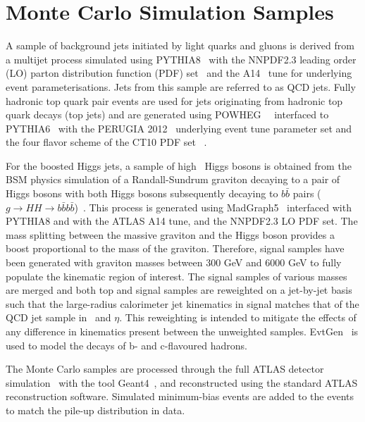 \section{Monte Carlo Simulation Samples}
\label{sec:mc}

\par A sample of background jets initiated by light quarks and gluons is derived from a multijet process simulated using PYTHIA8~\cite{Sjostrand:2007gs} with the NNPDF2.3 leading order (LO) parton distribution 
function (PDF) set~\cite{Ball:2012cx} and the A14~\cite{ATL-PHYS-PUB-2014-021} tune for underlying event parameterisations. 
Jets from this sample are referred to as QCD jets. Fully hadronic top quark pair events are used for jets originating from hadronic top quark decays (top jets) and are generated 
using POWHEG~\cite{Frixione:2007vw}~\cite{Nason:2004rx} interfaced to PYTHIA6~\cite{Sjostrand:2006za} with the PERUGIA 2012~\cite{Skands:2010ak} underlying event tune parameter set 
and the four flavor scheme of the CT10 PDF set ~\cite{Gao:2013xoa}.
\par For the boosted Higgs jets, a sample of high \pt~Higgs bosons is obtained from the BSM physics simulation of a Randall-Sundrum graviton decaying to a pair of Higgs bosons with both Higgs bosons 
subsequently decaying to $b\bar{b}$ pairs ($g\rightarrow HH \rightarrow b\bar{b}b\bar{b}$)~\cite{Randall:1999ee}. This process is generated using MadGraph5~\cite{Alwall:2014hca} 
interfaced with PYTHIA8 and with the ATLAS A14 tune, and the NNPDF2.3 LO PDF set. The mass splitting between the massive graviton and the Higgs boson provides a boost proportional to the mass of the graviton. 
Therefore, signal samples have been generated with graviton masses between 300 GeV and 6000 GeV to fully populate the kinematic region of interest. 
The signal samples of various masses are merged and both top and signal samples are reweighted on a jet-by-jet basis such that the large-radius calorimeter jet kinematics in signal matches that of the QCD jet sample in \pt~and $\eta$. 
This reweighting is intended to mitigate the effects of any difference in kinematics present between the unweighted samples. 
EvtGen~\cite{Lange:2001uf} is used to model the decays of b- and c-flavoured hadrons.
\par The Monte Carlo samples are processed through the full ATLAS detector simulation~\cite{Aad:2010ah} with the tool Geant4~\cite{Agostinelli:2002hh}, and reconstructed using the standard ATLAS reconstruction software. Simulated minimum-bias events are added to the events to match the pile-up distribution in data. 

